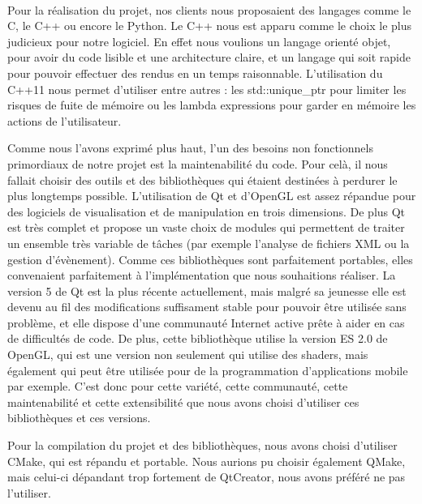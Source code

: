 \paragraph{}
        Pour la réalisation du projet, nos clients nous proposaient des langages comme le C, le C++ ou encore le Python. Le C++ nous est apparu comme le choix le plus judicieux pour notre logiciel. En effet nous voulions un langage orienté objet, pour avoir du code lisible et une architecture claire, et un langage qui soit rapide pour pouvoir effectuer des rendus en un temps raisonnable.
	L'utilisation du C++11 nous permet d'utiliser entre autres : les std::unique\_ptr pour limiter les risques de fuite de mémoire ou les lambda expressions pour garder en mémoire les actions de l'utilisateur.

        Comme nous l'avons exprimé plus haut, l'un des besoins non fonctionnels primordiaux de notre projet est la maintenabilité du code. Pour celà, il nous fallait choisir des outils et des bibliothèques qui étaient destinées à perdurer le plus longtemps possible.
        L'utilisation de Qt et d'OpenGL est assez répandue pour des logiciels de visualisation et de manipulation en trois dimensions. De plus Qt est très complet et propose un vaste choix de modules qui permettent de traiter un ensemble très variable de tâches (par exemple l'analyse de fichiers XML ou la gestion d'évènement). Comme ces bibliothèques sont parfaitement portables, elles convenaient parfaitement à l'implémentation que nous souhaitions réaliser.
        La version 5 de Qt est la plus récente actuellement, mais malgré sa jeunesse elle est devenu au fil des modifications suffisament stable pour pouvoir être utilisée sans problème, et elle dispose d'une communauté Internet active prête à aider en cas de difficultés de code. De plus, cette bibliothèque utilise la version ES 2.0 de OpenGL, qui est une version non seulement qui utilise des shaders, mais également qui peut être utilisée pour de la programmation d'applications mobile par exemple. C'est donc pour cette variété, cette communauté, cette maintenabilité et cette extensibilité que nous avons choisi d'utiliser ces bibliothèques et ces versions.

        Pour la compilation du projet et des bibliothèques, nous avons choisi d'utiliser CMake, qui est répandu et portable. Nous aurions pu choisir également QMake, mais celui-ci dépandant trop fortement de QtCreator, nous avons préféré ne pas l'utiliser.
